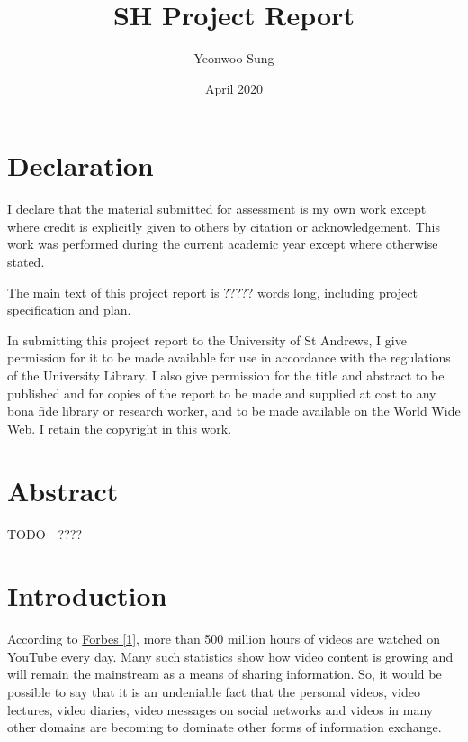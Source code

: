 \documentclass{article}
\title{SH Project Report}
\author{Yeonwoo Sung}
\date{April 2020}
\begin{document}
\maketitle

\newpage

\section*{Declaration}
I declare that the material submitted for assessment is my own work except where credit is explicitly given to others by citation or acknowledgement. 
This work was performed during the current academic year except where otherwise stated.

The main text of this project report is ????? words long, including project specification and plan.

In submitting this project report to the University of St Andrews, I give permission for it to be made 
available for use in accordance with the regulations of the University Library. I also give permission for 
the title and abstract to be published and for copies of the report to be made and supplied at cost to any bona fide 
library or research worker, and to be made available on the World Wide Web. I retain the copyright in this work.

\newpage

\section*{Abstract}

TODO - ????

\newpage

\tableofcontents

\newpage

\section{Introduction}

According to \hyperlink{ref1}{Forbes [1]}, more than 500 million hours of videos are watched on YouTube every day. Many such statistics show how video content is growing and will remain the mainstream as a means of sharing information. So, it would be possible to say that it is an undeniable fact that the personal videos, video lectures, video diaries, video messages on social networks and videos in many other domains are becoming to dominate other forms of information exchange.
\end{document}
